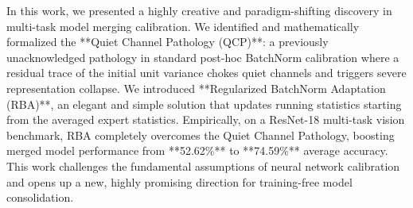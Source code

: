\documentclass{article}
\begin{document}
In this work, we presented a highly creative and paradigm-shifting discovery in multi-task model merging calibration. We identified and mathematically formalized the **Quiet Channel Pathology (QCP)**: a previously unacknowledged pathology in standard post-hoc BatchNorm calibration where a residual trace of the initial unit variance chokes quiet channels and triggers severe representation collapse. We introduced **Regularized BatchNorm Adaptation (RBA)**, an elegant and simple solution that updates running statistics starting from the averaged expert statistics. Empirically, on a ResNet-18 multi-task vision benchmark, RBA completely overcomes the Quiet Channel Pathology, boosting merged model performance from **52.62\%** to **74.59\%** average accuracy. This work challenges the fundamental assumptions of neural network calibration and opens up a new, highly promising direction for training-free model consolidation.



\end{document}
